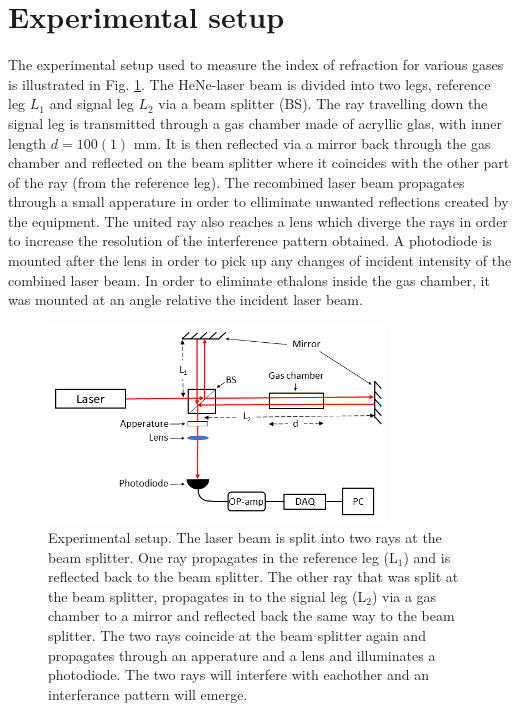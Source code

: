 \section{Experimental setup}

The experimental setup used to measure the index of refraction for various gases is illustrated in Fig. \ref{fig:experimentalSetup}. The HeNe-laser beam is divided into two legs, reference leg $L_1$ and signal leg $L_2$ via a beam splitter (BS). The ray travelling down the signal leg is transmitted through a gas chamber made of acryllic glas, with inner length $d=100(1)$ mm. It is then reflected via a mirror back through the gas chamber and reflected on the beam splitter where it coincides with the other part of the ray (from the reference leg). The recombined laser beam propagates through a small apperature in order to elliminate unwanted reflections created by the equipment. The united ray also reaches a lens which diverge the rays in order to increase the resolution of the interference pattern obtained. A photodiode is mounted after the lens in order to pick up any changes of incident intensity of the combined laser beam. In order to eliminate ethalons inside the gas chamber, it was mounted at an angle relative the incident laser beam.

\begin{figure}[H]
  \centering
  \includegraphics[width=0.8\textwidth]{Exp_setup.png}
  \caption{Experimental setup. The laser beam is split into two rays at the beam splitter. One ray propagates in the reference leg (L$_1$) and is reflected back to the beam splitter. The other ray that was split at the beam splitter, propagates in to the signal leg (L$_2$) via a gas chamber to a mirror and reflected back the same way to the beam splitter. The two rays coincide at the beam splitter again and propagates through an apperature and a lens and illuminates a photodiode. The two rays will interfere with eachother and an interferance pattern will emerge.}
  \label{fig:experimentalSetup}
\end{figure}

